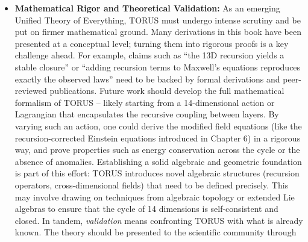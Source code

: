 \documentclass[
]{article}
\begin{document}
{\begin{itemize}
  be developed into a full stability theory\hspace{0pt}. Future research
  should formalize the \emph{recursion dynamics} by perhaps modeling a
  time-dependent approach to the fixed-point cycle or exploring
  recursion in slightly different settings to see if any alternative
  cycles could exist. Showing that the 14-layer TORUS cycle is an
  attractor -- the only robust solution -- would greatly strengthen the
  theory. If instead multiple recursion closures are mathematically
  possible, TORUS would need to explain why nature selected this
  particular one, or whether other universes (with different cycles)
  might be possible in principle. Addressing this challenge will likely
  involve advanced mathematical tools and perhaps computer simulations
  of how a hypothetical high-dimensional system might settle into a
  TORUS-like state.
\item
  \textbf{Mathematical Rigor and Theoretical Validation:} As an emerging
  Unified Theory of Everything, TORUS must undergo intense scrutiny and
  be put on firmer mathematical ground. Many derivations in this book
  have been presented at a conceptual level; turning them into rigorous
  proofs is a key challenge ahead\hspace{0pt}. For example, claims such
  as ``the 13D recursion yields a stable closure'' or ``adding recursion
  terms to Maxwell's equations reproduces exactly the observed laws''
  need to be backed by formal derivations and peer-reviewed
  publications. Future work should develop the full mathematical
  formalism of TORUS -- likely starting from a 14-dimensional action or
  Lagrangian that encapsulates the recursive coupling between
  layers\hspace{0pt}. By varying such an action, one could derive the
  modified field equations (like the recursion-corrected Einstein
  equations introduced in Chapter 6) in a rigorous way, and prove
  properties such as energy conservation across the cycle or the absence
  of anomalies. Establishing a solid algebraic and geometric foundation
  is part of this effort: TORUS introduces novel algebraic structures
  (recursion operators, cross-dimensional fields) that need to be
  defined precisely. This may involve drawing on techniques from
  algebraic topology or extended Lie algebras to ensure that the cycle
  of 14 dimensions is self-consistent and closed\hspace{0pt}. In tandem,
  \emph{validation} means confronting TORUS with what is already known.
  The theory should be presented to the scientific community through

\end{itemize}}
\end{document}
